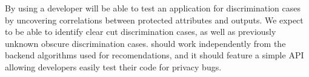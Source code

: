 By using \thetool a developer will be able to test an application for
discrimination cases by uncovering correlations between protected attributes
and outputs. We expect to be able to identify clear cut discrimination cases,
as well as previously unknown obscure discrimination cases. \thetool should
work independently from the backend algorithms used for recomendations,
and it should feature a
simple API allowing developers easily test their code for privacy bugs.

